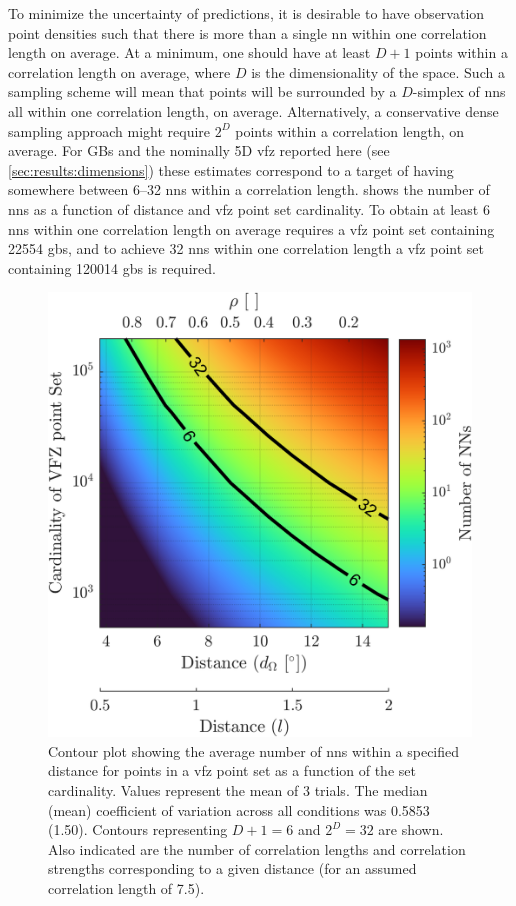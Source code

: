 \documentclass[final,twocolumn,12pt]{elsarticle}
\begin{document}
	To minimize the uncertainty of predictions, it is desirable to have observation point densities such that there is more than a single \gls{nn} within one correlation length on average. At a minimum, one should have at least $D+1$ points within a correlation length on average, where $D$ is the dimensionality of the space. Such a sampling scheme will mean that points will be surrounded by a $D$-simplex of \glspl{nn} all within one correlation length, on average. Alternatively, a conservative dense sampling approach might require $2^D$ points within a correlation length, on average. For GBs and the nominally 5D \gls{vfz} reported here (see \cref{sec:results:dimensions}) these estimates correspond to a target of having somewhere between \SIrange[range-phrase={--}]{6}{32}{} \glspl{nn} within a correlation length.  shows the number of \glspl{nn} as a function of distance and \gls{vfz} point set cardinality. To obtain at least \SI{6}{} \glspl{nn} within one correlation length on average requires a \gls{vfz} point set containing \SI{22554}{} \glspl{gb}, and to achieve \SI{32}{} \glspl{nn} within one correlation length a \gls{vfz} point set containing \SI{120014}{} \glspl{gb} is required.
	\begin{figure}
		\centering
		\includegraphics[scale=1]{figures/nncontour.png}
		\caption{Contour plot showing the average number of \glspl{nn} within a specified distance for points in a \gls{vfz} point set as a function of the set cardinality. Values represent the mean of 3 trials. The median (mean) coefficient of variation across all conditions was \SI{0.5853}{} (\SI{1.50}{}). Contours representing $D+1=6$ and $2^D = 32$ are shown. Also indicated are the number of correlation lengths and correlation strengths corresponding to a given distance (for an assumed correlation length of \SI{7.5}{\tobydeg}).}
		\label{fig:nncontour}
	\end{figure}
	
\end{document}
